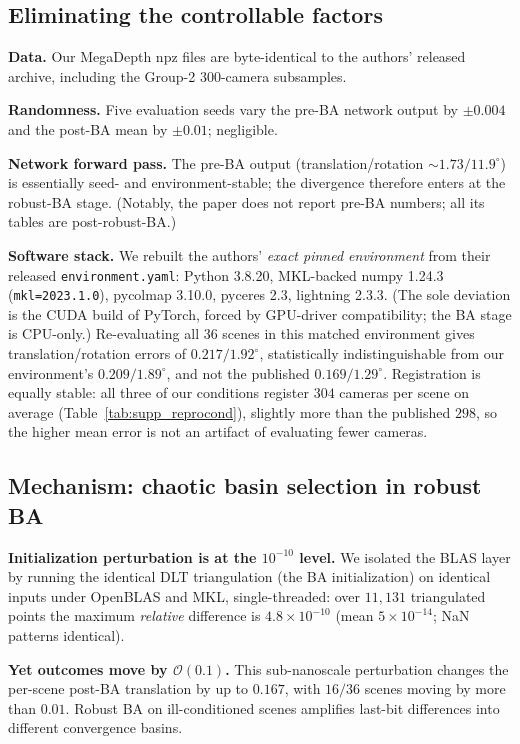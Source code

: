 \documentclass[10pt,twocolumn,letterpaper]{article}
\renewcommand{\deg}{^{\circ}}
\begin{document}
\subsection{Eliminating the controllable factors}\label{sec:factors}
\noindent\textbf{Data.} Our MegaDepth npz files are byte-identical to the authors' released
archive, including the Group-2 300-camera subsamples.

\noindent\textbf{Randomness.} Five evaluation seeds vary the pre-BA network output by
$\pm 0.004$ and the post-BA mean by $\pm 0.01$; negligible.

\noindent\textbf{Network forward pass.} The pre-BA output (translation/rotation
$\sim\!1.73/11.9\deg$) is essentially seed- and environment-stable; the divergence
therefore enters at the robust-BA stage. (Notably, the paper does not report pre-BA
numbers; all its tables are post-robust-BA.)

\noindent\textbf{Software stack.} We rebuilt the authors' \emph{exact pinned environment}
from their released \texttt{environment.yaml}: Python 3.8.20, MKL-backed numpy 1.24.3
(\texttt{mkl=2023.1.0}), pycolmap 3.10.0, pyceres 2.3, lightning 2.3.3. (The sole deviation
is the CUDA build of PyTorch, forced by GPU-driver compatibility; the BA stage is
CPU-only.) Re-evaluating all 36 scenes in this matched environment gives
translation/rotation errors of $0.217/1.92\deg$, statistically indistinguishable from
our environment's $0.209/1.89\deg$, and not the published $0.169/1.29\deg$. Registration is
equally stable: all three of our conditions register $304$ cameras per scene
on average (Table~\ref{tab:supp_reprocond}), slightly more than the published $298$,
so the higher mean error is not an artifact of evaluating fewer cameras.

\subsection{Mechanism: chaotic basin selection in robust BA}\label{sec:mech}
\noindent\textbf{Initialization perturbation is at the $10^{-10}$ level.} We isolated the
BLAS layer by running the identical DLT triangulation (the BA initialization) on identical
inputs under OpenBLAS and MKL, single-threaded: over $11{,}131$ triangulated points the
maximum \emph{relative} difference is $4.8\times 10^{-10}$ (mean $5\times10^{-14}$; NaN
patterns identical).

\noindent\textbf{Yet outcomes move by $\mathcal{O}(0.1)$.} This sub-nanoscale perturbation
changes the per-scene post-BA translation by up to $0.167$, with $16/36$ scenes moving by
more than $0.01$. Robust BA on ill-conditioned scenes amplifies last-bit differences into
different convergence basins.
\end{document}
